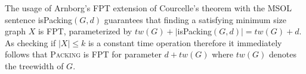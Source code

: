 \documentclass[12pt, a4paper]{article}
\theoremstyle{definition}
\newcommand{\mcO}{\mathcal{O}}
\begin{document}

The usage of Arnborg's FPT extension of Courcelle's theorem with the MSOL sentence isPacking$(G,d)$ guarantees that finding a satisfying minimum size graph $X$ is FPT, parameterized by $tw(G) + |$isPacking$(G,d)| = tw(G) + d$. As checking if $|X| \leq k$ is a constant time operation therefore it immediately follows that \textsc{Packing} is FPT for parameter $d+tw(G)$ where $tw(G)$ denotes the treewidth of $G$.




\end{document}
